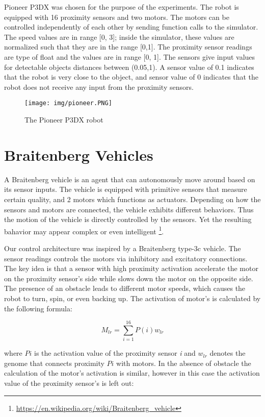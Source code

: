 \documentclass[format=acmsmall, review=false, screen=true]{acmart}
\begin{document}
Pioneer P3DX was chosen for the purpose of the experiments. The robot is equipped with 16 proximity sensors and two motors. The motors can be controlled independently of each other by sending function calls to the simulator. The speed values are in range [0, 3]; inside the simulator, these values are normalized such that they are in the range [0,1]. The proximity sensor readings are type of float and the values are in range [0, 1]. The sensors give input values for detectable objects distances between (0.05,1). A sensor value of 0.1 indicates that the robot is very close to the object, and sensor value of 0 indicates that the robot does not receive any input from the proximity sensors.

\begin{figure}[H]
  \texttt{[image: img/pioneer.PNG]}
  \caption{The Pioneer P3DX robot}
  \label{fig:pioneer-robot}
\end{figure}

\section{Braitenberg Vehicles}

A Braitenberg vehicle is an agent that can autonomously move around based on its sensor inputs. The vehicle is equipped with primitive sensors that measure certain quality, and 2 motors which functions as actuators. Depending on how the sensors and motors are connected, the vehicle exhibits different behaviors. Thus the motion of the vehicle is directly controlled by the sensors. Yet the resulting bahavior may appear complex or even intelligent \footnote{\url{https://en.wikipedia.org/wiki/Braitenberg_vehicle}}.

Our control architecture was inspired by a Braitenberg type-3c vehicle. The sensor readings controls the motors via inhibitory and excitatory connections. The key idea is that a sensor with high proximity activation accelerate the motor on the proximity sensor's side while slows down the motor on the opposite side. The presence of an obstacle leads to different motor speeds, which causes the robot to turn, spin, or even backing up. The activation of motor's is calculated by the following formula:

\[ M_{lr} = \sum_{i=1}^{16} P(i)w_{lr} \]

where \(P{i}\) is the activation value of the proximity sensor \emph{i} and \(w_{lr}\) denotes the genome that connects proximity \(P{i}\) with motors. In the absence of obstacle the calculation of the motor's activation is similar, however in this case the activation value of the proximity sensor's is left out:
\end{document}
